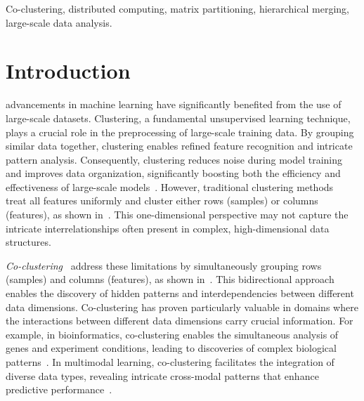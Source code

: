 \documentclass[journal]{IEEEtran}
\theoremstyle{definition}
\theoremstyle{remark} %
\renewcommand{\cite}[1]{~\autocite{#1}}
\begin{document}
\begin{IEEEkeywords}
    Co-clustering, distributed computing, matrix partitioning, hierarchical merging, large-scale data analysis.
\end{IEEEkeywords}


\section{Introduction}
\label{sec:introduction}
 advancements in machine learning have significantly benefited from the use of large-scale datasets. Clustering, a fundamental unsupervised learning technique, plays a crucial role in the preprocessing of large-scale training data. By grouping similar data together, clustering enables refined feature recognition and intricate pattern analysis. Consequently, clustering reduces noise during model training and improves data organization, significantly boosting both the efficiency and effectiveness of large-scale models\cite{raskutti2002CombiningClusteringCotraining, li2014ClusteringguidedSparseStructural, ghimatgar2018ImprovedFeatureSelection}. However, traditional clustering methods\cite{lloyd1982LeastSquaresQuantization, arthur2007KmeansAdvantagesCareful, mclachlan1987MixtureModelsInference} treat all features uniformly and cluster either rows (samples) or columns (features), as shown in~. This one-dimensional perspective may not capture the intricate interrelationships often present in complex, high-dimensional data structures.

\textit{Co-clustering}\cite{kluger2003SpectralBiclusteringMicroarray, yan2017CoclusteringMultidimensionalBig,wu2024AccurateDetectionEllipses} address these limitations by simultaneously grouping rows (samples) and columns (features), as shown in~. This bidirectional approach enables the discovery of hidden patterns and interdependencies between different data dimensions. Co-clustering has proven particularly valuable in domains where the interactions between different data dimensions carry crucial information. For example, in bioinformatics, co-clustering enables the simultaneous analysis of genes and experiment conditions, leading to discoveries of complex biological patterns\cite{higham2007SpectralClusteringIts, kluger2003SpectralBiclusteringMicroarray, madeira2004BiclusteringAlgorithmsBiological, zhao2012BiclusteringAnalysisPattern, golchev2015BiclusteringAnalysisGene}.
In multimodal learning, co-clustering facilitates the integration of diverse data types, revealing intricate cross-modal patterns that enhance predictive performance\cite{mu2022LearningHybridBehavior}.
\end{document}
